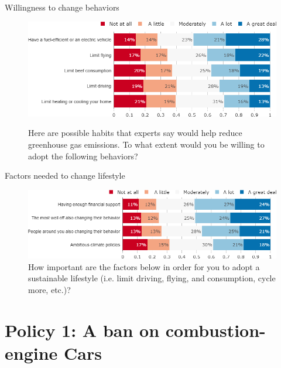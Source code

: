 \documentclass[aspectratio=169,9pt,dvipsnames]{beamer}
\begin{document}
\begin{frame}{Willingness to change behaviors}%
\begin{figure}[h!]
\centering
\caption{Here are possible habits that experts say would help reduce greenhouse gas emissions.
To what extent would you be willing to adopt the following behaviors?}
\includegraphics[width=.8\textwidth]{../figures/US/willing_US.png} \\
\end{figure}
\end{frame}

\begin{frame}{Factors needed to change lifestyle}%
\begin{figure}[h!]
\centering
\caption{How important are the factors below in order for you to adopt a sustainable lifestyle (i.e. limit driving, flying, and consumption, cycle more, etc.)?}
\includegraphics[width=1\textwidth]{../figures/US/condition_US.png}
\end{figure}
\end{frame}


\section{Policy 1: A ban on combustion-engine Cars}
\end{document}

